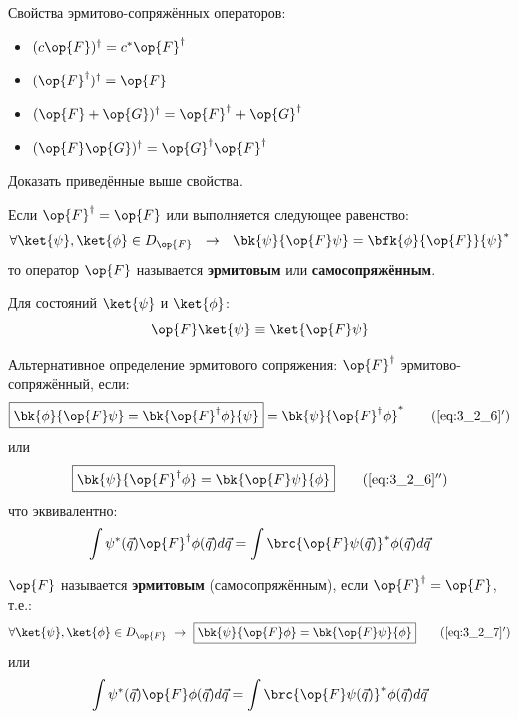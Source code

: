 Свойства эрмитово-сопряжённых операторов:
\begin{itemize}
\item $(c\op{F})^\dag = c^* \op{F}^\dag$
\item $(\op{F}^\dag)^\dag = \op{F}$
\item $(\op{F} + \op{G})^\dag = \op{F}^\dag + \op{G}^\dag$
\item $(\op{F}\op{G})^\dag = \op{G}^\dag \op{F}^\dag$
\end{itemize}

\begin{excr}
Доказать приведённые выше свойства.
\end{excr}

\begin{defn}
Если $\op{F}^\dag = \op{F}$ или выполняется следующее равенство:
\begin{equation}
\label{eq:3_2_7}
\forall \ket{\psi},\ket{\phi} \in D_{\op{F}} ~~\to~~  \bk{\psi}{\op{F}\psi} = \bfk{\phi}{\op{F}}{\psi}^*
\end{equation}
то оператор $\op{F}$ называется \textbf{эрмитовым} или \textbf{самосопряжённым}.
\end{defn}

Для состояний $\ket{\psi}$ и $\ket{\phi}$:
$$
\op{F}\ket{\psi} \equiv \ket{\op{F}\psi}
$$

Альтернативное определение эрмитового сопряжения: $\op{F}^\dag$ эрмитово-сопряжённый, если:
\begin{equation}
\label{eq:3_2_6_add}
\boxed{
	\bk{\phi}{\op{F}\psi} = \bk{\op{F}^\dag\phi}{\psi}
} = \bk{\psi}{\op{F}^\dag \phi}^*
\tag{\ref{eq:3_2_6}$'$}
\end{equation}
или
\begin{equation}
\label{eq:3_2_6_add_x2}
\boxed{
	\bk{\psi}{\op{F}^\dag \phi} = \bk{\op{F} \psi}{\phi}
}
\tag{\ref{eq:3_2_6}$''$}
\end{equation}
что эквивалентно:
$$
\int \psi^*(\vec{q}) \op{F}^\dag \phi(\vec{q}) d\vec{q} = \int \brc{\op{F} \psi(\vec{q})}^* \phi(\vec{q}) d\vec{q}
$$

\begin{defn}
$\op{F}$ называется \textbf{эрмитовым} (самосопряжённым), если $\op{F}^\dag = \op{F}$, т.е.:
\begin{equation}
\label{eq:3_2_7_add}
\forall \ket{\psi}, \ket{\phi} \in D_{\op{F}}  ~\to~ \boxed{ \bk{\psi}{\op{F} \phi} = \bk{\op{F}\psi}{\phi} }
\tag{\ref{eq:3_2_7}$'$}
\end{equation}
или
$$
\int \psi^*(\vec{q}) \op{F} \phi(\vec{q}) d\vec{q} = \int \brc{\op{F} \psi(\vec{q})}^* \phi(\vec{q}) d\vec{q}
$$
\end{defn}

